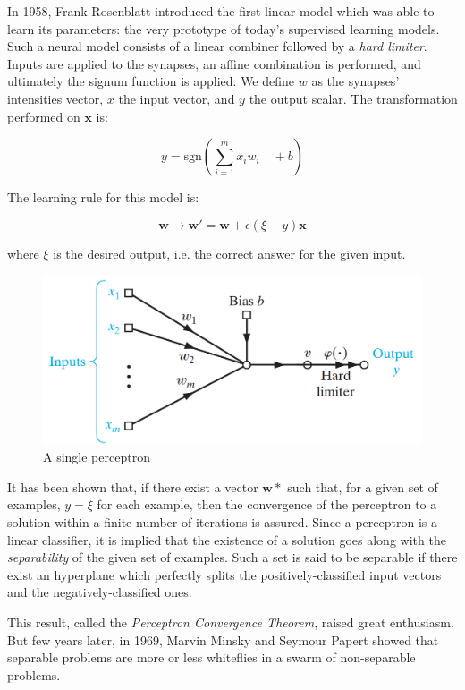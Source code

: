 \documentclass[a4paper, twoside]{article}
\begin{document}
    In 1958, Frank Rosenblatt introduced the first linear model which was able to learn its parameters: the very prototype of today's supervised learning models. Such a neural model consists of a linear combiner followed by a \textit{hard limiter}. Inputs are applied to the synapses, an affine combination is performed, and ultimately the signum function is applied. We define $w$ as the synapses' intensities vector, $x$ the input vector, and $y$ the output scalar. The transformation performed on $\boldsymbol{x}$ is:

    $$ y = \text{sgn}\left( \sum_{i=1}^m x_i w_i \quad + b \right)$$

    The learning rule for this model is:

    $$ \boldsymbol{w} \rightarrow \boldsymbol{w'} = \boldsymbol{w} + \epsilon (\xi - y) \boldsymbol{x}$$

    where $\xi$ is the desired output, i.e. the correct answer for the given input.


    \begin{figure}[H]
        \centering
        \includegraphics[width=0.65\linewidth]{perceptron.png}
        \caption{A single perceptron}
    \end{figure}

    It has been shown that, if there exist a vector $\boldsymbol{w}*$ such that, for a given set of examples, $y = \xi$ for each example, then the convergence of the perceptron to a solution within a finite number of iterations is assured. Since a perceptron is a linear classifier, it is implied that the existence of a solution goes along with the \textit{separability} of the given set of examples. Such a set is said to be separable if there exist an hyperplane which perfectly splits the positively-classified input vectors and the negatively-classified ones.

    This result, called the \textit{Perceptron Convergence Theorem}, raised great enthusiasm. But few years later, in 1969, Marvin Minsky and Seymour Papert showed that separable problems are more or less whiteflies in a swarm of non-separable problems.
\end{document}
